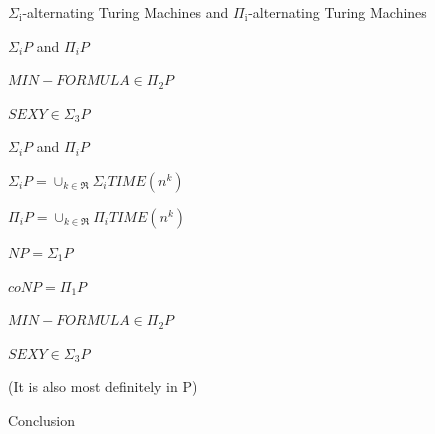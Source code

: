 \documentclass[presentation]{beamer}
\begin{document}
\begin{frame}[label={sec:orgfcecea4}]{\(\Sigma_{\text{i}}\)-alternating Turing Machines and \(\Pi_{\text{i}}\)-alternating Turing Machines}
\begin{block}{\(\Sigma_{i}P\) and \(\Pi _{i}P\)}
\begin{block}{\(MIN-FORMULA \in \Pi_{2}P\)}
\end{block}
\begin{block}{\(SEXY \in \Sigma_{3}P\)}
\end{block}
\end{block}
\begin{block}{\(\Sigma_{i}P\) and \(\Pi _{i}P\)}
\begin{block}{\(\Sigma_{i}P = \cup_{k \in \Re} \Sigma_{i}TIME(n^{k})\)}
\end{block}
\begin{block}{\(\Pi_{i}P = \cup_{k \in \Re} \Pi_{i}TIME(n^{k})\)}
\end{block}
\begin{block}{\(NP = \Sigma_{1}P\)}
\end{block}
\begin{block}{\(coNP = \Pi_{1}P\)}
\end{block}
\begin{block}{\(MIN-FORMULA \in \Pi_{2}P\)}
\end{block}
\begin{block}{\(SEXY \in \Sigma_{3}P\)}
\end{block}
\begin{block}{(It is also most definitely in P)}
\end{block}
\end{block}
\end{frame}
\begin{frame}[label={sec:org6a9fcd6}]{Conclusion}
\end{frame}
\end{document}
